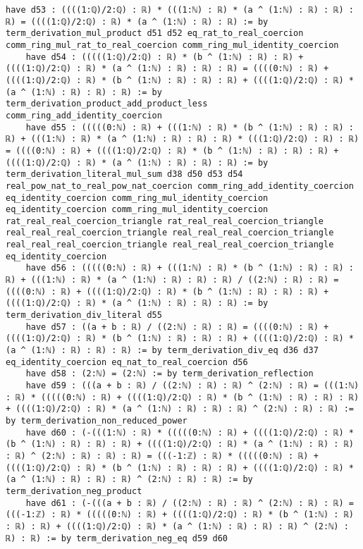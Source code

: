 \documentclass{article}
\begin{document}
\begin{tcolorbox}[colback=white!10, width=\linewidth]
\begin{lstlisting}[language=Lean4]
    have d53 : ((((1:ℚ)/2:ℚ) : ℝ) * (((1:ℕ) : ℝ) * (a ^ (1:ℕ) : ℝ) : ℝ) : ℝ) = ((((1:ℚ)/2:ℚ) : ℝ) * (a ^ (1:ℕ) : ℝ) : ℝ) := by term_derivation_mul_product d51 d52 eq_rat_to_real_coercion comm_ring_mul_rat_to_real_coercion comm_ring_mul_identity_coercion
    have d54 : (((((1:ℚ)/2:ℚ) : ℝ) * (b ^ (1:ℕ) : ℝ) : ℝ) + ((((1:ℚ)/2:ℚ) : ℝ) * (a ^ (1:ℕ) : ℝ) : ℝ) : ℝ) = ((((0:ℕ) : ℝ) + ((((1:ℚ)/2:ℚ) : ℝ) * (b ^ (1:ℕ) : ℝ) : ℝ) : ℝ) + ((((1:ℚ)/2:ℚ) : ℝ) * (a ^ (1:ℕ) : ℝ) : ℝ) : ℝ) := by term_derivation_product_add_product_less comm_ring_add_identity_coercion
    have d55 : (((((0:ℕ) : ℝ) + (((1:ℕ) : ℝ) * (b ^ (1:ℕ) : ℝ) : ℝ) : ℝ) + (((1:ℕ) : ℝ) * (a ^ (1:ℕ) : ℝ) : ℝ) : ℝ) * (((1:ℚ)/2:ℚ) : ℝ) : ℝ) = ((((0:ℕ) : ℝ) + ((((1:ℚ)/2:ℚ) : ℝ) * (b ^ (1:ℕ) : ℝ) : ℝ) : ℝ) + ((((1:ℚ)/2:ℚ) : ℝ) * (a ^ (1:ℕ) : ℝ) : ℝ) : ℝ) := by term_derivation_literal_mul_sum d38 d50 d53 d54 real_pow_nat_to_real_pow_nat_coercion comm_ring_add_identity_coercion eq_identity_coercion comm_ring_mul_identity_coercion eq_identity_coercion comm_ring_mul_identity_coercion rat_real_real_coercion_triangle rat_real_real_coercion_triangle real_real_real_coercion_triangle real_real_real_coercion_triangle real_real_real_coercion_triangle real_real_real_coercion_triangle eq_identity_coercion
    have d56 : (((((0:ℕ) : ℝ) + (((1:ℕ) : ℝ) * (b ^ (1:ℕ) : ℝ) : ℝ) : ℝ) + (((1:ℕ) : ℝ) * (a ^ (1:ℕ) : ℝ) : ℝ) : ℝ) / ((2:ℕ) : ℝ) : ℝ) = ((((0:ℕ) : ℝ) + ((((1:ℚ)/2:ℚ) : ℝ) * (b ^ (1:ℕ) : ℝ) : ℝ) : ℝ) + ((((1:ℚ)/2:ℚ) : ℝ) * (a ^ (1:ℕ) : ℝ) : ℝ) : ℝ) := by term_derivation_div_literal d55
    have d57 : ((a + b : ℝ) / ((2:ℕ) : ℝ) : ℝ) = ((((0:ℕ) : ℝ) + ((((1:ℚ)/2:ℚ) : ℝ) * (b ^ (1:ℕ) : ℝ) : ℝ) : ℝ) + ((((1:ℚ)/2:ℚ) : ℝ) * (a ^ (1:ℕ) : ℝ) : ℝ) : ℝ) := by term_derivation_div_eq d36 d37 eq_identity_coercion eq_nat_to_real_coercion d56
    have d58 : (2:ℕ) = (2:ℕ) := by term_derivation_reflection
    have d59 : (((a + b : ℝ) / ((2:ℕ) : ℝ) : ℝ) ^ (2:ℕ) : ℝ) = (((1:ℕ) : ℝ) * (((((0:ℕ) : ℝ) + ((((1:ℚ)/2:ℚ) : ℝ) * (b ^ (1:ℕ) : ℝ) : ℝ) : ℝ) + ((((1:ℚ)/2:ℚ) : ℝ) * (a ^ (1:ℕ) : ℝ) : ℝ) : ℝ) ^ (2:ℕ) : ℝ) : ℝ) := by term_derivation_non_reduced_power
    have d60 : (-(((1:ℕ) : ℝ) * (((((0:ℕ) : ℝ) + ((((1:ℚ)/2:ℚ) : ℝ) * (b ^ (1:ℕ) : ℝ) : ℝ) : ℝ) + ((((1:ℚ)/2:ℚ) : ℝ) * (a ^ (1:ℕ) : ℝ) : ℝ) : ℝ) ^ (2:ℕ) : ℝ) : ℝ) : ℝ) = (((-1:ℤ) : ℝ) * (((((0:ℕ) : ℝ) + ((((1:ℚ)/2:ℚ) : ℝ) * (b ^ (1:ℕ) : ℝ) : ℝ) : ℝ) + ((((1:ℚ)/2:ℚ) : ℝ) * (a ^ (1:ℕ) : ℝ) : ℝ) : ℝ) ^ (2:ℕ) : ℝ) : ℝ) := by term_derivation_neg_product
    have d61 : (-(((a + b : ℝ) / ((2:ℕ) : ℝ) : ℝ) ^ (2:ℕ) : ℝ) : ℝ) = (((-1:ℤ) : ℝ) * (((((0:ℕ) : ℝ) + ((((1:ℚ)/2:ℚ) : ℝ) * (b ^ (1:ℕ) : ℝ) : ℝ) : ℝ) + ((((1:ℚ)/2:ℚ) : ℝ) * (a ^ (1:ℕ) : ℝ) : ℝ) : ℝ) ^ (2:ℕ) : ℝ) : ℝ) := by term_derivation_neg_eq d59 d60

\end{lstlisting}
\end{tcolorbox}
\end{document}

